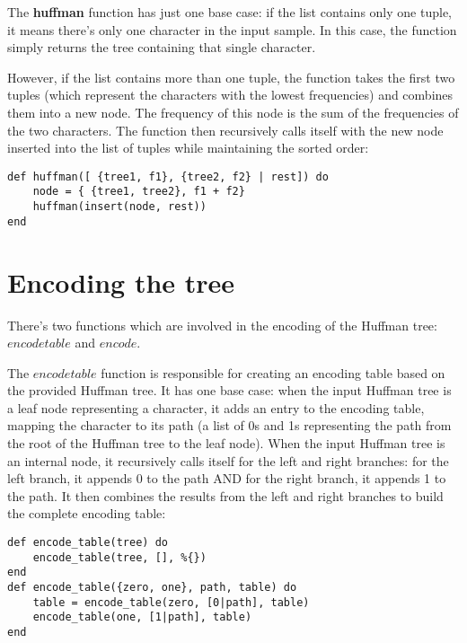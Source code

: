 \documentclass[a4paper,11pt]{article}
\begin{document}
The \textbf{huffman} function has just one base case: if the list contains only one tuple, it means there's only one character in the input sample. In this case, the function simply returns the tree containing that single character. 

However, if the list contains more than one tuple, the function takes the first two tuples (which represent the characters with the lowest frequencies) and combines them into a new node. The frequency of this node is the sum of the frequencies of the two characters. The function then recursively calls itself with the new node inserted into the list of tuples while maintaining the sorted order: 
\begin{verbatim}
def huffman([ {tree1, f1}, {tree2, f2} | rest]) do
    node = { {tree1, tree2}, f1 + f2}
    huffman(insert(node, rest))
end
\end{verbatim}

\section*{Encoding the tree}
There's two functions which are involved in the encoding of the Huffman tree: $encodetable$ and $encode$.

The $encodetable$ function is responsible for creating an encoding table based on the provided Huffman tree.
It has one base case: when the input Huffman tree is a leaf node representing a character, it adds an entry to the encoding table, mapping the character to its path (a list of 0s and 1s representing the path from the root of the Huffman tree to the leaf node). When the input Huffman tree is an internal node, it recursively calls itself for the left and right branches: for the left branch, it appends 0 to the path AND for the right branch, it appends 1 to the path. It then combines the results from the left and right branches to build the complete encoding table:
\begin{verbatim}
def encode_table(tree) do
    encode_table(tree, [], %{})
end
def encode_table({zero, one}, path, table) do
    table = encode_table(zero, [0|path], table)
    encode_table(one, [1|path], table)
end
\end{verbatim}
\end{document}
